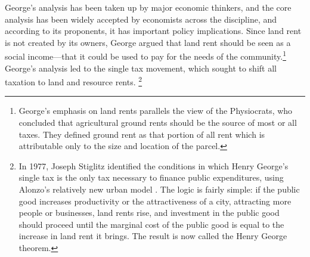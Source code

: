George's analysis has been taken up by major economic thinkers, and the core analysis has been widely accepted by economists across the discipline, and according to its proponents, it has important policy implications. Since land rent is not created by its owners, George argued that land rent should be seen as a social income---that it could be used to pay for the needs of the community.\footnote{George's emphasis on land rents parallels the view of the Physiocrats, who concluded that agricultural \gls{ground rents} should be the source of most or all taxes. They defined ground rent as that portion of all rent which is attributable only to the size and location of the parcel.} %
George's analysis led to the \gls{single tax} movement, which sought to shift all taxation to land  and resource rents.%
\footnote{In 1977, Joseph Stiglitz identified the conditions in which Henry George's \gls{single tax} is  the only tax necessary to finance public expenditures, using Alonzo's relatively new urban model \cite{GET-stliglits_henry-georege-1979}.  %
The logic is fairly simple: if the public good increases productivity or the attractiveness of a city, attracting more people or businesses, land rents rise, and investment in the public good should proceed until the marginal cost of the public good is equal to the increase in land rent it brings. The result is now called the \gls{Henry George theorem}.} %


